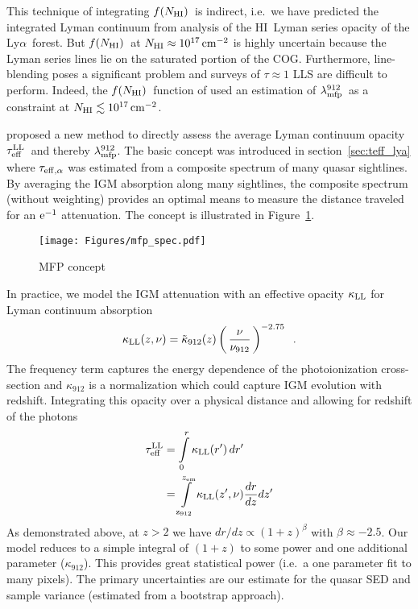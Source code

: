 \documentclass[graybox]{svmult}
\newcommand{\HI}{H{\sc I}}
\def\lya{Ly$\alpha$}
\def\ltp{\left ( \,}
\def\rtp{\, \right  ) }
\def\intl{\int\limits}
\newcommand{\mnhi}{N_{\rm HI}}
\def\cm#1{\, {\rm cm^{#1}}}
\def\mfnhi{f(\mnhi)}
\def\fnhi{$\mfnhi$}
\def\mlmfp{\lambda_{\rm mfp}^{912}}
\def\lmfp{$\mlmfp$}
\def\mtll{\tau_{\rm eff}^{\rm LL}}
\def\tll{$\mtll$}
\begin{document}
This technique of integrating \fnhi\ is indirect, i.e.\ we
have predicted the integrated Lyman continuum from
analysis of the \HI\ Lyman series opacity of the \lya\ forest.
But \fnhi\ at $\mnhi \approx 10^{17} \cm{-2}$ is highly uncertain
because the Lyman series lines lie
on the saturated portion of the COG.  Furthermore, 
line-blending poses a significant problem and 
surveys of $\tau \approx 1$ LLS are difficult to perform.
Indeed, the \fnhi\ function of \cite{pro+14} used an estimation
of \lmfp\ as a constraint at $\mnhi \lesssim 10^{17} \cm{-2}$. 

\cite{pwo09} proposed a new method to directly assess 
the average Lyman continuum opacity \tll\ and thereby \lmfp.
The basic concept was introduced in section~\ref{sec:teff_lya}
where $\tau_{\rm eff, \alpha}$ was estimated from a composite
spectrum of many quasar sightlines.
By averaging the IGM absorption along many sightlines, 
the composite spectrum (without weighting) provides 
an optimal means to
measure the distance traveled for an $\rm e^{-1}$ attenuation.
The concept is illustrated in Figure~\ref{fig:mfp_spec}.

%
\begin{figure}[b]
\sidecaption
\texttt{[image: Figures/mfp\_spec.pdf]}
%
%
\caption{MFP concept
}
\label{fig:mfp_spec}       %
\end{figure}

In practice, we model the IGM attenuation with
an effective opacity $\kappa_{\rm LL}$
for Lyman continuum absorption
\begin{equation}
\kappa_{\rm LL}(z,\nu) = \tilde\kappa_{912}(z) \ltp \frac{\nu}{\nu_{912}} \rtp^{-2.75} \;\; .
\end{equation}
The frequency term captures the energy dependence of the
photoionization cross-section and 
$\kappa_{912}$ is a normalization which could capture IGM evolution 
with redshift.
Integrating this opacity over a physical distance and allowing 
for redshift of the photons
\begin{align}
\mtll &= \intl_0^r \kappa_{\rm LL}(r') \, dr'  \\
&= \intl_{\rm z_{912}}^{z_{\rm em}} \kappa_{\rm LL}(z',\nu) \frac{dr}{dz} dz'
\end{align}
As demonstrated above, at $z>2$ we have
$dr/dz \propto (1+z)^\beta$ with $\beta \approx -2.5$.
Our model reduces to a simple integral
of $(1+z)$ to some power and one additional parameter ($\kappa_{912}$).
This provides great statistical power (i.e.\ a one parameter fit to
many pixels).  The primary
uncertainties are our estimate for the quasar SED
and sample variance (estimated from a bootstrap approach).
\end{document}
